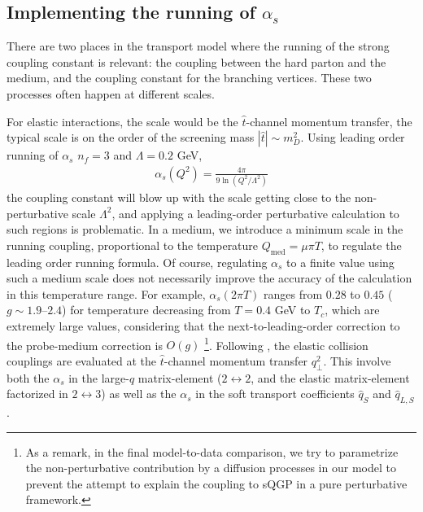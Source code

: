 \subsection{Implementing the running of $\alpha_s$}
There are two places in the transport model where the running of the strong coupling constant is relevant:
the coupling between the hard parton and the medium, and the coupling constant for the branching vertices.
These two processes often happen at different scales.

For elastic interactions, the scale would be the $\hat{t}$-channel momentum transfer, the typical scale is on the order of the screening mass $|\hat{t}| \sim m_D^2$.  
Using leading order running of $\alpha_s$ $n_f = 3$ and $\Lambda = 0.2$ GeV, 
\begin{eqnarray}
\alpha_s(Q^2) = \frac{4\pi}{9\ln\left(Q^2/\Lambda^2\right)}
\end{eqnarray}
the coupling constant will blow up with the scale getting close to the non-perturbative scale $\Lambda^2$, and applying a leading-order perturbative calculation to such regions is problematic. 
In a medium, we introduce a minimum scale in the running coupling, proportional to the temperature $Q_{\textrm{med}} = \mu \pi T$, to regulate the leading order running formula.
Of course, regulating $\alpha_s$ to a finite value using such a medium scale does not necessarily improve the accuracy of the calculation in this temperature range. 
For example, $\alpha_s(2\pi T)$ ranges from $0.28$ to $0.45$ ($g \sim 1.9$--$2.4$) for temperature decreasing from $T=0.4$ GeV to $T_c$, which are extremely large values, considering that the next-to-leading-order correction to the probe-medium correction is $O(g)$  
\footnote{\singlespacing As a remark, in the final model-to-data comparison, we try to parametrize the non-perturbative contribution by a diffusion processes in our model to prevent the attempt to explain the coupling to sQGP in a pure perturbative framework.}.
Following \cite{Arnold:2008zu}, the elastic collision couplings are evaluated at the $\hat{t}$-channel momentum transfer $q_\perp^2$.
This involve both the $\alpha_s$ in the large-$q$ matrix-element ($2\leftrightarrow 2$, and the elastic matrix-element factorized in $2\leftrightarrow 3$) as well as the $\alpha_s$ in the soft transport coefficients $\hat{q}_S$ and $\hat{q}_{L, S}$.

